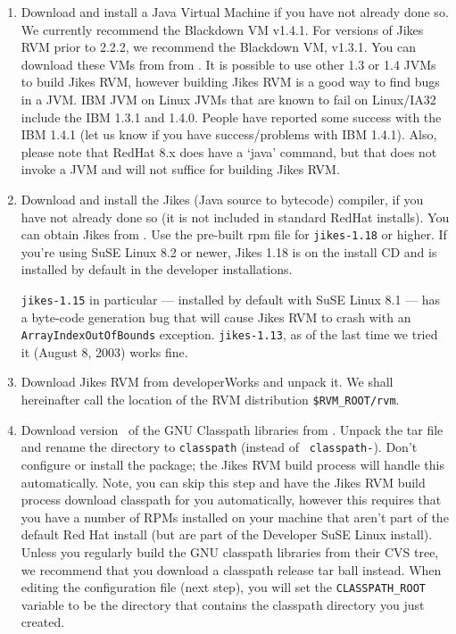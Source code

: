 \begin{enumerate}

\item Download and install a Java Virtual Machine if you have not
already done so.  We currently recommend the Blackdown VM v1.4.1. 
For versions of Jikes RVM prior to 2.2.2, we recommend
the Blackdown VM, v1.3.1.  You can download these VMs from 
from \xlink{{\tt \BlackdownURL}} {\BlackdownURL}. 
It is possible to use other 1.3 or 1.4 JVMs to build Jikes RVM,
however building Jikes RVM is a good way to find bugs in a JVM.
{\index IBM JVM on Linux}
JVMs that are known to fail on Linux/IA32 include the IBM 1.3.1 and
1.4.0.  People have reported some success with the IBM 1.4.1 (let us
know if you have success/problems with IBM 1.4.1). Also, please note
that RedHat 8.x does have a `java' command, but that does not invoke a
JVM and will not suffice for building Jikes RVM.

\item Download and install the Jikes (Java source to bytecode)
compiler, if you have not already 
done so (it is not included in standard RedHat installs).  You can
obtain Jikes from .
Use the pre-built rpm file for {\tt jikes-1.18} or higher.   
If you're using SuSE Linux 8.2 or newer, Jikes 1.18 is on the install CD and is installed by default in the developer installations.


{\tt jikes-1.15} in
particular --- installed by default with SuSE Linux 8.1 --- has a
byte-code generation bug that will cause Jikes RVM to crash with an
{\tt ArrayIndexOutOfBounds} exception.  {\tt jikes-1.13}, as of the last
time we tried it (August 8, 2003) works fine.

\item Download Jikes RVM from developerWorks and unpack it.  We shall
hereinafter call the location of the RVM distribution {\tt \$RVM\_ROOT/rvm}.

\item Download version \classpathversion\ of the GNU Classpath
libraries from 
\xlink{{\tt \classpathftp}}{\classpathftp}. 
Unpack the tar file and rename the
directory to {\tt classpath} (instead of {\tt
classpath-\classpathversion}). Don't 
configure or install the package; the Jikes RVM build process will
handle this automatically.  Note, you can skip this step and have the
Jikes RVM build process download classpath for you automatically,
however this requires that you have a number of RPMs installed
on your machine that aren't part of the default Red Hat install (but are part of the Developer SuSE Linux install).
Unless you regularly build the GNU classpath libraries from their CVS
tree, we recommend that you download a classpath release tar ball
instead. When editing the configuration file (next step), you will set
the {\tt CLASSPATH\_ROOT} variable to be the directory that contains the
classpath directory you just created.  


\end{enumerate}
